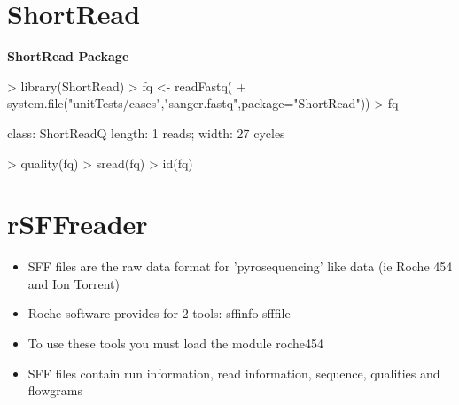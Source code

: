 \documentclass[pdf]{beamer}
\begin{document}
\section{ShortRead}
\begin{frame}[fragile]
\textbf{ShortRead Package}
\begin{block}{}
\begin{footnotesize}
\begin{Schunk}
\begin{Sinput}
> library(ShortRead)
> fq <- readFastq(
+   system.file("unitTests/cases","sanger.fastq",package="ShortRead"))
> fq
\end{Sinput}
\begin{Soutput}
class: ShortReadQ
length: 1 reads; width: 27 cycles
\end{Soutput}
\end{Schunk}
\begin{Schunk}
\begin{Sinput}
> quality(fq)
> sread(fq)
> id(fq)
\end{Sinput}
\end{Schunk}
\end{footnotesize}
\end{block}
\end{frame}

\section{rSFFreader}
\begin{frame}
\begin{itemize}
\item SFF files are the raw data format for 'pyrosequencing' like data (ie Roche 454 and Ion Torrent)
\item Roche software provides for 2 tools: sffinfo sfffile
\item To use these tools you must load the module roche454
\item SFF files contain run information, read information, sequence, qualities and flowgrams
\end{itemize}
\end{frame}
\end{document}
